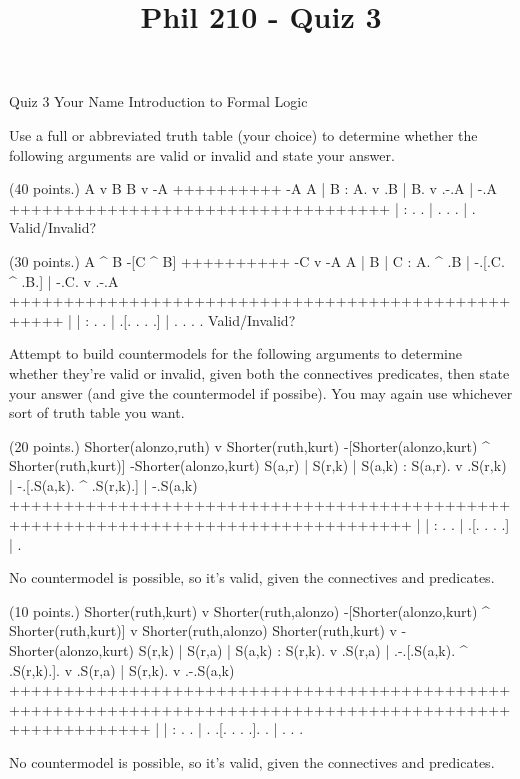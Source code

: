 
\title{Phil 210 - Quiz 3}

\heading
Quiz 3
Your Name
Introduction to Formal Logic
\endheading

Use a full or abbreviated truth table (your choice) to determine whether the following arguments are valid or invalid and state your answer.

\problems
{} (40 points.)
\argument
 A v B
 B v -A
++++++++++
 -A
\endargument
        \answer
        \truthtable
         A | B : A. v .B | B. v .-.A | -.A
        +++++++++++++++++++++++++++++++++++
           |   :  .   .  |  .   . .  |  . 
        \endtruthtable
        Valid/Invalid?
        \endanswer

 (30 points.)
\argument
 A ^ B
 -[C ^ B]
++++++++++
 -C v -A
\endargument
        \answer
        \truthtable
         A | B | C : A. ^ .B | -.[.C. ^ .B.] | -.C. v .-.A
        +++++++++++++++++++++++++++++++++++++++++++++++++++
           |   |   :  .   .  |  .[. .   . .] |  . .   . . 
        \endtruthtable
        Valid/Invalid?
        \endanswer

\endproblems

Attempt to build countermodels for the following arguments to determine whether they're valid or invalid, given both the connectives predicates, then state your answer (and give the countermodel if possibe). You may again use whichever sort of truth table you want.

\problems
{} (20 points.)
\argument
 Shorter(alonzo,ruth) v Shorter(ruth,kurt)
 -[Shorter(alonzo,kurt) ^ Shorter(ruth,kurt)]
\argumentline
 -Shorter(alonzo,kurt)
\endargument
        \answer
        \truthtable
         S(a,r) | S(r,k) | S(a,k) : S(a,r). v .S(r,k) | -.[.S(a,k). ^ .S(r,k).] | -.S(a,k)
        +++++++++++++++++++++++++++++++++++++++++++++++++++++++++++++++++++++++++++++++++++
                |        |        :       .   .       |  .[.      .   .      .] |  .   
        \endtruthtable

        \heightmodel
        
        \endheightmodel
        \OR
        No countermodel is possible, so it's valid, given the connectives and predicates.
        \endanswer

 (10 points.)
\argument
 Shorter(ruth,kurt) v Shorter(ruth,alonzo)
 -[Shorter(alonzo,kurt) ^ Shorter(ruth,kurt)] v Shorter(ruth,alonzo)
\argumentline
 Shorter(ruth,kurt) v -Shorter(alonzo,kurt)
\endargument
        \answer{}
        \truthtable
         S(r,k) | S(r,a) | S(a,k) : S(r,k). v .S(r,a) | .-.[.S(a,k). ^ .S(r,k).]. v .S(r,a) | S(r,k). v .-.S(a,k)
        +++++++++++++++++++++++++++++++++++++++++++++++++++++++++++++++++++++++++++++++++++++++++++++++++++++++++
                |        |        :       .   .       | . .[.      .   .      .].   .       |       .   . .   
        \endtruthtable

        \heightmodel
        
        \endheightmodel
        \OR
        No countermodel is possible, so it's valid, given the connectives and predicates.
        \endanswer

\endproblems
\bye
